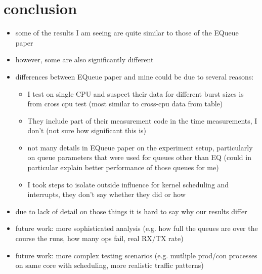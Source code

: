 \section{conclusion}
\begin{itemize}
    \item some of the results I am seeing are quite similar to those of the EQueue paper
    \item however, some are also significantly different
    \item differences between EQueue paper and mine could be due to several reasons:
        \begin{itemize}
            \item I test on single CPU and suspect their data for different burst sizes is from cross cpu
                test (most similar to cross-cpu data from table)
            \item They include part of their measurement code in the time measurements, I don't (not sure how
                significant this is)
            \item not many details in EQueue paper on the experiment setup, particularly on queue parameters
                that were used for queues other than EQ (could in particular explain better performance of
                those queues for me)
            \item I took steps to isolate outside influence for kernel scheduling and interrupts, they don't
                say whether they did or how
        \end{itemize}
    \item due to lack of detail on those things it is hard to say why our results differ
    \item future work: more sophisticated analysis (e.g. how full the queues are over the course the runs,
        how many ops fail, real RX/TX rate)
    \item future work: more complex testing scenarios (e.g. mutliple prod/con processes on same core with
        scheduling, more realistic traffic patterns)
\end{itemize}
